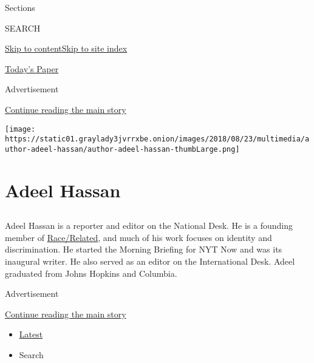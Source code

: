 Sections

SEARCH

\protect\hyperlink{site-content}{Skip to
content}\protect\hyperlink{site-index}{Skip to site index}

\href{https://myaccount.nytimes3xbfgragh.onion/auth/login?response_type=cookie\&client_id=vi}{}

\href{https://www.nytimes3xbfgragh.onion/section/todayspaper}{Today's
Paper}

Advertisement

\protect\hyperlink{after-top}{Continue reading the main story}

\texttt{[image: https://static01.graylady3jvrrxbe.onion/images/2018/08/23/multimedia/author-adeel-hassan/author-adeel-hassan-thumbLarge.png]}

\hypertarget{adeel-hassan}{%
\section{Adeel Hassan}\label{adeel-hassan}}

\subsection{}

Adeel Hassan is a reporter and editor on the National Desk. He is a
founding member of
\href{https://www.nytimes3xbfgragh.onion/spotlight/race}{Race/Related},
and much of his work focuses on identity and discrimination. He started
the Morning Briefing for NYT Now and was its inaugural writer. He also
served as an editor on the International Desk. Adeel graduated from
Johns Hopkins and Columbia.

Advertisement

\protect\hyperlink{after-mid1}{Continue reading the main story}

\begin{itemize}
\tightlist
\item
  \protect\hyperlink{stream-panel}{Latest}
\item
  Search
\end{itemize}

